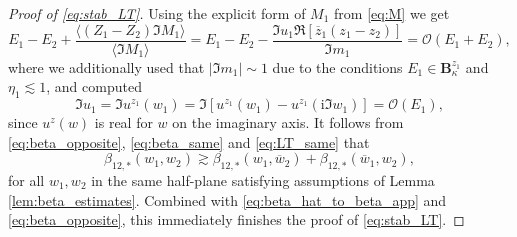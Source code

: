 \documentclass[10pt]{amsart}
\numberwithin{equation}{section}
\newcommand{\ii}{\mathrm{i}}
\begin{document}
\begin{proof}[Proof of \eqref{eq:stab_LT}] Using the explicit form of $M_1$ from \eqref{eq:M} we get
\begin{equation}
E_1-E_2 + \frac{\langle (Z_1-Z_2)\Im M_1\rangle}{\langle \Im M_1\rangle} = E_1-E_2 - \frac{\Im u_1\Re[\overline{z}_1(z_1-z_2)]}{\Im m_1} = \mathcal{O}(E_1+E_2),
\label{eq:LT_same}
\end{equation}
where we additionally used that $|\Im m_1|\sim 1$ due to the conditions $E_1\in\mathbf{B}_\kappa^{z_1}$ and $\eta_1\lesssim 1$, and computed
\begin{equation}
\Im u_1=\Im u^{z_1}(w_1) = \Im [u^{z_1}(w_1)-u^{z_1}(\ii\Im w_1)] = \mathcal{O}(E_1), 
\end{equation} 
since $u^z(w)$ is real for $w$ on the imaginary axis. It follows from \eqref{eq:beta_opposite}, \eqref{eq:beta_same} and \eqref{eq:LT_same} that
\begin{equation}
\beta_{12,*}(w_1,w_2)\gtrsim \beta_{12,*}(w_1,\overline{w}_2) + \beta_{12,*}(\overline{w}_1,w_2),
\end{equation}
for all $w_1, w_2$ in the same half-plane satisfying assumptions of Lemma \ref{lem:beta_estimates}. Combined with \eqref{eq:beta_hat_to_beta_app} and \eqref{eq:beta_opposite}, this immediately finishes the proof of \eqref{eq:stab_LT}. 
\end{proof}
\end{document}
